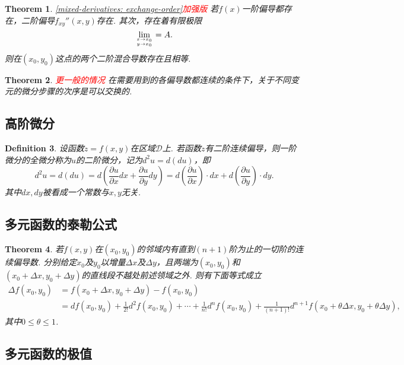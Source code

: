 \documentclass{article}
\newtheorem{theorem}{Theorem}[section]
\newtheorem{definition}[theorem]{Definition}
\newcommand{\redt}[1]{\textcolor{red}{#1}}
\begin{document}
\begin{theorem}
\rm \redt{\ref{mixed-derivatives: exchange-order}加强版} 若$f(x)$一阶偏导都存在，二阶偏导$f_{xy}''(x,y)$存在. 其次，存在着有限极限
$$
\lim\limits_{x \rightarrow x_0 \atop y \rightarrow x_0} = A.
$$
则在$(x_0,y_0)$这点的两个二阶混合导数存在且相等.
\end{theorem}

\begin{theorem}
\rm \redt{更一般的情况} 在需要用到的各偏导数都连续的条件下，关于不同变元的微分步骤的次序是可以交换的. 
\end{theorem}


\subsection{高阶微分}

\begin{definition}
\rm 设函数$z=f(x,y)$在区域$\mathcal{D}$上. 若函数$z$有二阶连续偏导，则一阶微分的全微分称为$u$的二阶微分，记为$d^2 u = d(du)$，即
$$
d^2 u = d(du) = d(\frac{\partial u}{\partial x}dx + \frac{\partial u}{\partial y}dy) = d\left(\frac{\partial u}{\partial x}\right)\cdot dx + d\left(\frac{\partial u}{\partial y}\right)\cdot dy.
$$
其中$dx,dy$被看成一个常数与$x,y$无关. 
\end{definition}

\subsection{多元函数的泰勒公式}

\begin{theorem}
\rm 若$f(x,y)$在$(x_0,y_0)$的邻域内有直到$(n+1)$阶为止的一切阶的连续偏导数. 分别给定$x_0$及$y_0$以增量$\Delta x$及$\Delta y$，且两端为$(x_0,y_0)$和$(x_0+\Delta x , y_0 + \Delta y)$的直线段不越处前述领域之外. 则有下面等式成立
$$
\begin{array}{ll}
\Delta f(x_0,y_0) &= f(x_0 + \Delta x, y_0 + \Delta y)-f(x_0,y_0) \\
&= df(x_0,y_0) + \frac{1}{2!}d^2f(x_0,y_0) + \cdots + \frac{1}{n!}d^nf(x_0,y_0) + \frac{1}{(n+1)!}d^{n+1}f(x_0+\theta\Delta x, y_0 + \theta\Delta y),
\end{array}
$$
其中$0 \leq \theta \leq 1$. 
\end{theorem}

\subsection{多元函数的极值}
\end{document}
